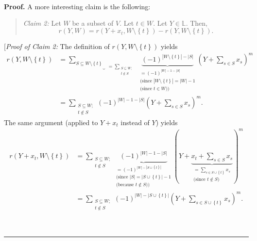 \documentclass[numbers=enddot,12pt,final,onecolumn,notitlepage]{scrartcl}%
\theoremstyle{definition}
\newenvironment{statement}{\begin{quote}}{\end{quote}}
\newenvironment{proof}[1][Proof]{\noindent\textbf{#1.} }{\ \rule{0.5em}{0.5em}}
\let\sumnonlimits\sum
\renewcommand{\sum}{\sumnonlimits\limits}
\newenvironment{vershort}{}{}
\begin{document}
\begin{proof}
A more interesting claim is the following:

\begin{statement}
\textit{Claim 2:} Let $W$ be a subset of $V$. Let $t\in W$. Let $Y\in
\mathbb{L}$. Then,%
\[
r\left(  Y,W\right)  =r\left(  Y+x_{t},W\setminus\left\{  t\right\}  \right)
-r\left(  Y,W\setminus\left\{  t\right\}  \right)  .
\]

\end{statement}

\begin{vershort}
[\textit{Proof of Claim 2:} The definition of $r\left(  Y,W\setminus\left\{
t\right\}  \right)  $ yields%
\begin{align}
r\left(  Y,W\setminus\left\{  t\right\}  \right)   &  =\underbrace{\sum
_{S\subseteq W\setminus\left\{  t\right\}  }}_{\substack{=\sum
_{\substack{S\subseteq W;\\t\notin S}}}}\underbrace{\left(  -1\right)
^{\left\vert W\setminus\left\{  t\right\}  \right\vert -\left\vert
S\right\vert }}_{\substack{=\left(  -1\right)  ^{\left\vert W\right\vert
-1-\left\vert S\right\vert }\\\text{(since }\left\vert W\setminus\left\{
t\right\}  \right\vert =\left\vert W\right\vert -1\\\text{(since }t\in
W\text{))}}}\left(  Y+\sum_{s\in S}x_{s}\right)  ^{m}\nonumber\\
&  =\sum_{\substack{S\subseteq W;\\t\notin S}}\left(  -1\right)  ^{\left\vert
W\right\vert -1-\left\vert S\right\vert }\left(  Y+\sum_{s\in S}x_{s}\right)
^{m}. \label{pf.cor.polar2.c2.pf.short.1}%
\end{align}
The same argument (applied to $Y+x_{t}$ instead of $Y$) yields%
\begin{align}
r\left(  Y+x_{t},W\setminus\left\{  t\right\}  \right)   &  =\sum
_{\substack{S\subseteq W;\\t\notin S}}\underbrace{\left(  -1\right)
^{\left\vert W\right\vert -1-\left\vert S\right\vert }}_{\substack{=\left(
-1\right)  ^{\left\vert W\right\vert -\left\vert S\cup\left\{  t\right\}
\right\vert }\\\text{(since }\left\vert S\right\vert =\left\vert S\cup\left\{
t\right\}  \right\vert -1\\\text{(because }t\notin S\text{))}}}\left(
Y+\underbrace{x_{t}+\sum_{s\in S}x_{s}}_{\substack{=\sum_{s\in S\cup\left\{
t\right\}  }x_{s}\\\text{(since }t\notin S\text{)}}}\right)  ^{m}\nonumber\\
&  =\sum_{\substack{S\subseteq W;\\t\notin S}}\left(  -1\right)  ^{\left\vert
W\right\vert -\left\vert S\cup\left\{  t\right\}  \right\vert }\left(
Y+\sum_{s\in S\cup\left\{  t\right\}  }x_{s}\right)  ^{m}.
\label{pf.cor.polar2.c2.pf.short.5}%
\end{align}



\end{vershort}
\end{proof}
\end{document}
